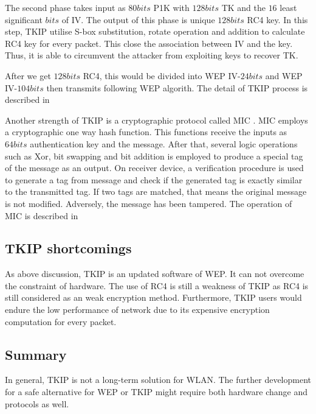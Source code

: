 The second phase takes input as $80 bits$ \ac{P1K} with $128 bits$ \ac{TK} and the $16$ least significant $bits$ of \ac{IV}. The output of this phase is unique $128 bits$ \ac{RC4} key. In this step, \ac{TKIP} utilise S-box substitution, rotate operation and addition to calculate \ac{RC4} key for every packet. This close the association between \ac{IV} and the key. Thus, it is able to circumvent the attacker from exploiting  keys to recover \ac{TK}.

After we get $128 bits$ \ac{RC4}, this would be divided into \ac{WEP} \ac{IV}-$24 bits$ and \ac{WEP} \ac{IV}-$104 bits$ then transmits following \ac{WEP} algorith. The detail of \ac{TKIP} process is described in %

Another strength of \ac{TKIP} is a cryptographic protocol called \ac{MIC} \cite{1318903}. \ac{MIC} employs a cryptographic one way hash function. This functions receive the inputs as $64 bits$ authentication key and the message. After that, several logic operations such as \ac{Xor}, bit swapping and bit addition is employed to produce a special tag of the message as an output. On receiver device, a verification procedure is used to generate a tag from message and check if the generated tag is exactly similar to the transmitted tag. If two tags are matched, that means the original message is not modified. Adversely, the message has been tampered. The operation of \ac{MIC} is described in %

\subsection{TKIP shortcomings}
As above discussion, \ac{TKIP} is an updated software of \ac{WEP}. It can not overcome the constraint of hardware. The use of \ac{RC4} is still a weakness of \ac{TKIP} as \ac{RC4} is still considered as an weak encryption method. Furthermore, \ac{TKIP} users would endure the low performance of network due to its expensive encryption computation for every packet. 
\subsection{Summary}
In general, \ac{TKIP} is not a long-term solution for \ac{WLAN}. The further development for a safe alternative for \ac{WEP} or \ac{TKIP} might require both hardware change and protocols as well.